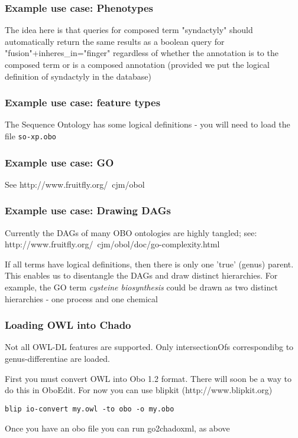 \subsubsection{Example use case: Phenotypes}

The idea here is that queries for composed term "syndactyly" should
automatically return the same results as a boolean query for
"fusion"+inheres_in="finger" regardless of whether the annotation is
to the composed term or is a composed annotation (provided we put the
logical definition of syndactyly in the database)

\subsubsection{Example use case: feature types}

The Sequence Ontology has some logical definitions - you will need to
load the file {\tt so-xp.obo}

\subsubsection{Example use case: GO}

See
http://www.fruitfly.org/~cjm/obol

\subsubsection{Example use case: Drawing DAGs}

Currently the DAGs of many OBO ontologies are highly tangled; see:
http://www.fruitfly.org/~cjm/obol/doc/go-complexity.html

If all terms have logical definitions, then there is only one 'true'
(genus) \isa parent. This enables us to disentangle the DAGs and draw
distinct hierarchies. For example, the GO term {\em cysteine
biosynthesis} could be drawn as two distinct hierarchies - one process
and one chemical

\subsubsection{Loading OWL into Chado}

Not all OWL-DL features are supported. Only intersectionOfs
correspondibg to genus-differentiae are loaded.

First you must convert OWL into Obo 1.2 format. There will soon be a
way to do this in OboEdit. For now you can use blipkit
(http://www.blipkit.org)

\begin{verbatim}
blip io-convert my.owl -to obo -o my.obo
\end{verbatim}

Once you have an obo file you can run go2chadoxml, as above

